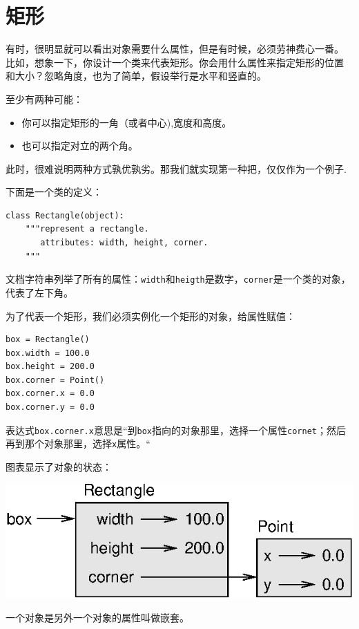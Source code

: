 \section{矩形}

有时，很明显就可以看出对象需要什么属性，但是有时候，必须劳神费心一番。
比如，想象一下，你设计一个类来代表矩形。你会用什么属性来指定矩形的位置
和大小？忽略角度，也为了简单，假设举行是水平和竖直的。


至少有两种可能：

\begin{itemize}

\item 你可以指定矩形的一角（或者中心),宽度和高度。

\item 也可以指定对立的两个角。
\end{itemize}

此时，很难说明两种方式孰优孰劣。那我们就实现第一种把，仅仅作为一个例子.


下面是一个类的定义：

\beforeverb
\begin{verbatim}
class Rectangle(object):
    """represent a rectangle. 
       attributes: width, height, corner.
    """
\end{verbatim}
\afterverb
%

文档字符串列举了所有的属性：{\tt width}和{\tt heigth}是数字，{\tt corner}是一个类的对象，代表了左下角。

为了代表一个矩形，我们必须实例化一个矩形的对象，给属性赋值：

\beforeverb
\begin{verbatim}
box = Rectangle()
box.width = 100.0
box.height = 200.0
box.corner = Point()
box.corner.x = 0.0
box.corner.y = 0.0
\end{verbatim}
\afterverb

表达式{\tt box.corner.x}意思是“到{\tt box}指向的对象那里，选择一个属性{\tt cornet}；然后再到那个对象那里，选择{\tt x}属性。“

图表显示了对象的状态：


\beforefig
\centerline{\includegraphics{figs/rectangle.eps}}
\afterfig
一个对象是另外一个对象的属性叫做嵌套。

